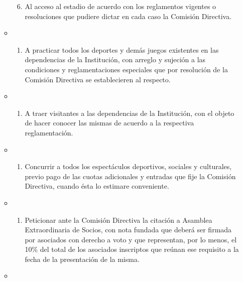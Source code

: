 \documentclass[]{book}
\providecommand{\tightlist}{%
  \setlength{\itemsep}{0pt}\setlength{\parskip}{0pt}}
\begin{document}
\begin{itemize}
\begin{itemize}
\begin{enumerate}
    \setcounter{enumi}{5}
    \tightlist
    \item
      Al acceso al estadio de acuerdo con los reglamentos vigentes o
      resoluciones que pudiere dictar en cada caso la Comisión
      Directiva.
    \end{enumerate}
  \item
    \begin{enumerate}
    \def\labelenumi{\alph{enumi})}
    \setcounter{enumi}{6}
    \tightlist
    \item
      A practicar todos los deportes y demás juegos existentes en las
      dependencias de la Institución, con arreglo y sujeción a las
      condiciones y reglamentaciones especiales que por resolución de la
      Comisión Directiva se establecieren al respecto.
    \end{enumerate}
  \item
    \begin{enumerate}
    \def\labelenumi{\alph{enumi})}
    \setcounter{enumi}{7}
    \tightlist
    \item
      A traer visitantes a las dependencias de la Institución, con el
      objeto de hacer conocer las mismas de acuerdo a la respectiva
      reglamentación.
    \end{enumerate}
  \item
    \begin{enumerate}
    \def\labelenumi{\roman{enumi})}
    \tightlist
    \item
      Concurrir a todos los espectáculos deportivos, sociales y
      culturales, previo pago de las cuotas adicionales y entradas que
      fije la Comisión Directiva, cuando ésta lo estimare conveniente.
    \end{enumerate}
  \item
    \begin{enumerate}
    \def\labelenumi{\alph{enumi})}
    \setcounter{enumi}{9}
    \tightlist
    \item
      Peticionar ante la Comisión Directiva la citación a Asamblea
      Extraordinaria de Socios, con nota fundada que deberá ser firmada
      por asociados con derecho a voto y que representan, por lo menos,
      el 10\% del total de los asociados inscriptos que reúnan ese
      requisito a la fecha de la presentación de la misma.
    \end{enumerate}
  \item
    \begin{enumerate}
    \def\labelenumi{\alph{enumi})}
    \setcounter{enumi}{10}
    \tightlist

\end{enumerate}
\end{itemize}
\end{itemize}
\end{document}
